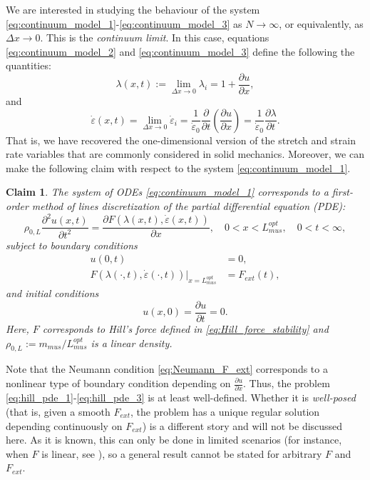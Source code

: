\documentclass{sfuthesis}
\numberwithin{equation}{section}
\numberwithin{figure}{chapter}
\numberwithin{table}{chapter}
\newtheorem{claim}[theorem]{Claim}
\theoremstyle{definition}
\newcommand{\pder}[2]{\dfrac{\partial #1}{\partial #2}}
\newcommand{\depsilon}{\dot{\varepsilon}}
\begin{document}
We are interested in studying the behaviour of the system \eqref{eq:continuum_model_1}-\eqref{eq:continuum_model_3} as $N \to \infty$, or equivalently, as $\Delta x \to 0$. This is the \textit{continuum limit}. In this case, equations \eqref{eq:continuum_model_2} and \eqref{eq:continuum_model_3} define the following the quantities:
\begin{equation}
    \lambda(x,t) := \lim_{\Delta x \to 0} \lambda_i = 1 + \pder{u}{x},
\end{equation}
and
\begin{equation}
    \depsilon(x,t) = \lim_{\Delta x \to 0} \depsilon_i = \dfrac{1}{\depsilon_0} \pder{}{t}\left(\pder{u}{x} \right) = \dfrac{1}{\depsilon_0} \pder{\lambda}{t}.
\end{equation}
That is, we have recovered the one-dimensional version of the stretch and strain rate variables that are commonly considered in solid mechanics. Moreover, we can make the following claim with respect to the system \eqref{eq:continuum_model_1}.

\begin{claim} \label{cl:hill_pde}
The system of ODEs \eqref{eq:continuum_model_1} corresponds to a first-order method of lines discretization of the partial differential equation (PDE):
\begin{equation} \label{eq:hill_pde_1}
    \rho_{0,L} \pder{^2 u(x,t)}{t^2}  = \pder{F(\lambda(x,t),\depsilon(x,t))}{x}, \quad 0 < x < L_{mus}^{opt}, \quad 0 < t < \infty,
\end{equation}
subject to boundary conditions
\begin{subequations} \label{eq:hill_pde_2}
    \begin{align}
        u(0,t) &= 0, \\
        F(\lambda(\cdot, t),\depsilon (\cdot, t))\Big|_{x=L_{mus}^{opt}} &= F_{ext}(t), \label{eq:Neumann_F_ext}
    \end{align}
\end{subequations}
and initial conditions
\begin{equation} \label{eq:hill_pde_3}
    u(x,0) = \pder{u}{t} = 0.
\end{equation}
Here, $F$ corresponds to Hill's force defined in \eqref{eq:Hill_force_stability} and $\rho_{0,L} := m_{mus}/L_{mus}^{opt}$ is a linear density.
\end{claim}

Note that the Neumann condition \eqref{eq:Neumann_F_ext} corresponds to a nonlinear type of boundary condition depending on $\frac{\partial u}{\partial x}$. Thus, the problem \eqref{eq:hill_pde_1}-\eqref{eq:hill_pde_3} is at least well-defined. Whether it is \textit{well-posed} (that is, given a smooth $F_{ext}$, the problem has a unique regular solution depending continuously on $F_{ext}$) is a different story and will not be discussed here. As it is known, this can only be done in limited scenarios (for instance, when $F$ is linear, see \cite{TruesdellNoll2004}), so a general result cannot be stated for arbitrary $F$ and $F_{ext}$.
\end{document}
